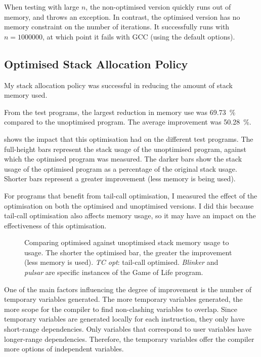 \documentclass[00-main.tex]{subfiles}
\begin{document}
When testing with large $n$, the non-optimised version quickly runs out of memory, and throws an exception.
In contrast, the optimised version has no memory constraint on the number of iterations.
It successfully runs with $n = \num{1000000}$, at which point it fails with GCC (using the default options).


\subsection{Optimised Stack Allocation Policy}\label{sec:eval:optimised stack allocation}

My stack allocation policy was successful in reducing the amount of stack memory used.

From the test programs, the largest reduction in memory use was \SI{69.73}{\percent} compared to the unoptimised program.
The average improvement was \SI{50.28}{\percent}.

 shows the impact that this optimisation had on the different test programs.
The full-height bars represent the stack usage of the unoptimised program, against which the optimised program was measured.
The darker bars show the stack usage of the optimised program as a percentage of the original stack usage.
Shorter bars represent a greater improvement (less memory is being used).

For programs that benefit from tail-call optimisation, I measured the effect of the optimisation on both the optimised and unoptimised versions.
I did this because tail-call optimisation also affects memory usage, so it may have an impact on the effectiveness of this optimisation.

\begin{figure}[t]
  \centering
  \caption{Comparing optimised against unoptimised stack memory usage to usage. The shorter the optimised bar, the greater the improvement (less memory is used). \emph{TC opt}: tail-call optimised. \emph{Blinker} and \emph{pulsar} are specific instances of the Game of Life program.}%
  \label{fig:comparing stack usage optimisation across programs}
\end{figure}

One of the main factors influencing the degree of improvement is the number of temporary variables generated.
The more temporary variables generated, the more scope for the compiler to find non-clashing variables to overlap.
Since temporary variables are generated locally for each instruction, they only have short-range dependencies.
Only variables that correspond to user variables have longer-range dependencies.
Therefore, the temporary variables offer the compiler more options of independent variables.
\end{document}
